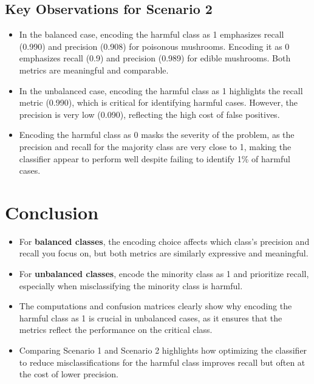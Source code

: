 \begin{notechapter}
\subsection{Key Observations for Scenario 2}
\begin{itemize}
    \item In the balanced case, encoding the harmful class as 1 
    emphasizes recall (0.990) and precision (0.908) for poisonous 
    mushrooms. Encoding it as 0 emphasizes recall (0.9) and 
    precision (0.989) for edible mushrooms. Both metrics are 
    meaningful and comparable.
    \item In the unbalanced case, encoding the harmful class as 1 
    highlights the recall metric (0.990), which is critical for 
    identifying harmful cases. However, the precision is very low 
    (0.090), reflecting the high cost of false positives.
    \item Encoding the harmful class as 0 masks the severity of 
    the problem, as the precision and recall for the majority class 
    are very close to 1, making the classifier appear to perform 
    well despite failing to identify 1\% of harmful cases.
\end{itemize}

\section{Conclusion}
\begin{itemize}
    \item For \textbf{balanced classes}, the encoding choice 
    affects which class's precision and recall you focus on, 
    but both metrics are similarly expressive and meaningful.
    \item For \textbf{unbalanced classes}, encode the minority 
    class as 1 and prioritize recall, especially when 
    misclassifying the minority class is harmful.
    \item The computations and confusion matrices clearly show 
    why encoding the harmful class as 1 is crucial in unbalanced 
    cases, as it ensures that the metrics reflect the performance 
    on the critical class.
    \item Comparing Scenario 1 and Scenario 2 highlights how 
    optimizing the classifier to reduce misclassifications for 
    the harmful class improves recall but often at the cost of 
    lower precision.
\end{itemize}
\end{notechapter}
